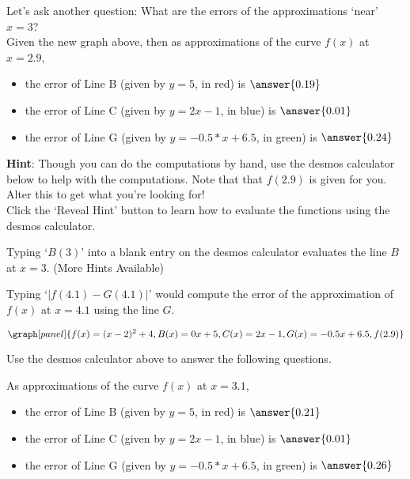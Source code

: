 \documentclass[handout,nooutcomes]{ximera}
\begin{document}
\begin{question}
Let's ask another question: What are the errors of the approximations `near' $x=3$? \\

Given the new graph above, then as approximations of the curve $f(x)$ at {\bf $x=2.9$},
\begin{itemize}
\item the error of Line B (given by $y=5$, in red) is $\answer{0.19}$
\item the error of Line C (given by $y=2x-1$, in blue) is $\answer{0.01}$
\item the error of Line G (given by $y=-0.5*x + 6.5$, in green) is $\answer{0.24}$
\end{itemize}

\textbf{Hint}: Though you can do the computations by hand, use the
desmos calculator below to help with the computations. 
Note that that $f(2.9)$ is given for you. Alter this to get what you're looking for!\\
Click the `Reveal Hint' button to learn how to evaluate the functions using
the desmos calculator.\\
\begin{hint}
Typing `$B(3)$' into a blank entry on the desmos calculator
evaluates the line $B$ at $x=3$. (More Hints Available)
\end{hint}
\begin{hint}
Typing `$|f(4.1) - G(4.1)|$' would compute the error of the approximation
of $f(x)$ at $x=4.1$ using the line $G$.
\end{hint}
\[
\graph[panel]{f(x) = (x - 2)^2 + 4, B(x) = 0x + 5, C(x) = 2x -1, G(x) = -0.5x + 6.5, f(2.9)}
\]

\medskip

Use the desmos calculator above to answer the following questions.

As approximations of the curve $f(x)$ at {\bf $x=3.1$},\\
\begin{itemize}
\item the error of Line B (given by $y=5$, in red) is $\answer{0.21}$\\
\item the error of Line C (given by $y=2x-1$, in blue) is $\answer{0.01}$\\
\item the error of Line G (given by $y=-0.5*x + 6.5$, in green) is $\answer{0.26}$\\
\end{itemize}
\end{question}
\end{document}
